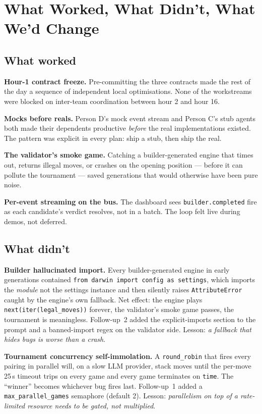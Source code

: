 \documentclass[11pt]{article}
\begin{document}
\section{What Worked, What Didn't, What We'd Change}
\label{sec:retro}

\subsection{What worked}

\textbf{Hour-1 contract freeze.} Pre-committing the three contracts
made the rest of the day a sequence of independent local optimisations.
None of the workstreams were blocked on inter-team coordination
between hour 2 and hour 16.

\textbf{Mocks before reals.} Person D's mock event stream and
Person C's stub agents both made their dependents productive
\emph{before} the real implementations existed. The pattern was
explicit in every plan: ship a stub, then ship the real.

\textbf{The validator's smoke game.} Catching a builder-generated
engine that times out, returns illegal moves, or crashes on the
opening position --- before it can pollute the tournament --- saved
generations that would otherwise have been pure noise.

\textbf{Per-event streaming on the bus.} The dashboard sees
\texttt{builder.completed} fire as each candidate's verdict resolves,
not in a batch. The loop felt live during demos, not deferred.

\subsection{What didn't}

\textbf{Builder hallucinated import.} Every builder-generated engine
in early generations contained
\texttt{from darwin import config as settings}, which imports the
\emph{module} not the settings instance and then silently raises
\texttt{AttributeError} caught by the engine's own fallback. Net
effect: the engine plays \texttt{next(iter(legal\_moves))} forever,
the validator's smoke game passes, the tournament is meaningless.
Follow-up~2 added the explicit-imports section to the prompt and a
banned-import regex on the validator side. Lesson: \emph{a fallback
that hides bugs is worse than a crash}.

\textbf{Tournament concurrency self-immolation.} A
\texttt{round\_robin} that fires every pairing in parallel will, on a
slow LLM provider, stack moves until the per-move 25\,s timeout
trips on every game and every game terminates on \texttt{time}. The
``winner'' becomes whichever bug fires last. Follow-up~1 added a
\texttt{max\_parallel\_games} semaphore (default 2). Lesson:
\emph{parallelism on top of a rate-limited resource needs to be
gated, not multiplied}.
\end{document}
